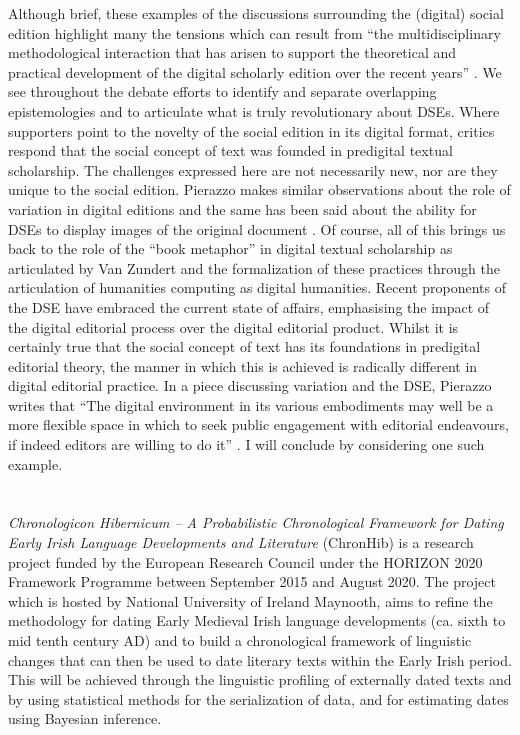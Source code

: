 \begin{paper}
Although brief, these examples of the discussions surrounding the (digital) social edition highlight many the tensions which can result from ``the multidisciplinary methodological interaction that has arisen to support the theoretical and practical development of the digital scholarly edition over the recent years'' \citep[83]{zundert_barely_2016}. We see throughout the debate efforts to identify and separate overlapping epistemologies and to articulate what is truly revolutionary about DSEs. Where supporters point to the novelty of the social edition in its digital format, critics respond that the social concept of text was founded in predigital textual scholarship. The challenges expressed here are not necessarily new, nor are they unique to the social edition. Pierazzo makes similar observations about the role of variation in digital editions \citep[45--46]{pierazzo_modelling_2016} and the same has been said about the ability for DSEs to display images of the original document \citep[181--183]{robinson_digital_2016}. Of course, all of this brings us back to the role of the ``book metaphor'' in digital textual scholarship as articulated by Van Zundert and the formalization of these practices through the articulation of humanities computing as digital humanities. Recent proponents of the DSE have embraced the current state of affairs, emphasising the impact of the digital editorial process over the digital editorial product. Whilst it is certainly true that the social concept of text has its foundations in predigital editorial theory, the manner in which this is achieved is radically different in digital editorial practice. In a piece discussing variation and the DSE, Pierazzo writes that ``The digital environment in its various embodiments may well be a more flexible space in which to seek public engagement with editorial endeavours, if indeed editors are willing to do it'' \citep[55]{pierazzo_modelling_2016}. I will conclude by considering one such example.

\section*{}
\textit{Chronologicon Hibernicum – A Probabilistic Chronological Framework for Dating Early Irish Language Developments and Literature} (ChronHib) is a research project funded by the European Research Council under the HORIZON 2020 Framework Programme between September 2015 and August 2020. The project which is hosted by National University of Ireland Maynooth, aims to refine the methodology for dating Early Medieval Irish language developments (ca. sixth to mid tenth century AD) and to build a chronological framework of linguistic changes that can then be used to date literary texts within the Early Irish period. This will be achieved through the linguistic profiling of externally dated texts and by using statistical methods for the serialization of data, and for estimating dates using Bayesian inference. 


\end{paper}
